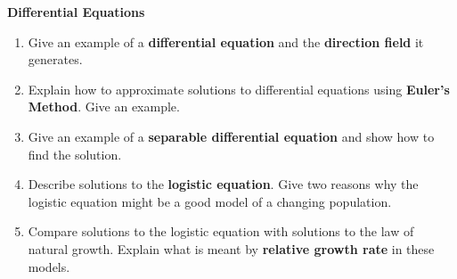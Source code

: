 \documentclass[11pt]{article}
\begin{document}
{\bf Differential Equations}
\begin{enumerate}
\item {Give an example of a {\bf differential equation} and the {\bf direction field} it generates.}
\item {Explain how to approximate solutions to differential equations using  {\bf Euler's Method}.  Give an example.}
\item {Give an example of a {\bf separable differential equation} and show how to find the solution.}
\item {Describe solutions to the  {\bf logistic equation}.  Give two reasons why the logistic equation might be a good model of a changing population.}
\item {Compare solutions to the logistic equation with solutions to the law of natural growth.  Explain what is meant by {\bf relative growth rate} in these models.}

\end{enumerate}
\end{document}
